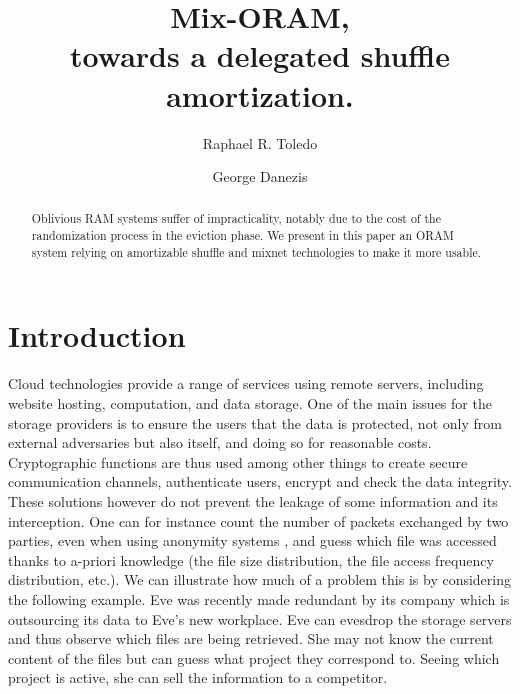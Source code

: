 \documentclass[conference]{IEEEtran}
\newcommand{\raphael}[1]{\textcolor{blue}{Raphael: #1}}
\begin{document}
\author{Raphael R. Toledo}
\author{George Danezis}


\title{Mix-ORAM,\\ towards a delegated shuffle amortization.}

\maketitle

\begin{abstract}
{Oblivious RAM systems suffer of impracticality, notably due to the cost of the randomization process in the eviction phase.
We present in this paper an ORAM system relying on amortizable shuffle and mixnet technologies to make it more usable.}
\end{abstract}

\section{Introduction}
\iffalse
\begin{itemize}
 \item Introduction to ORAM (we have to hide the access pattern) ~/
 \item Different ORAM over time \raphael{p.2 TODO}
 \item Eviction is too costly to happen at once /
 \item Emergence of A.S. \raphael{TODO}
 \item Combining ORAM and AS \raphael{p.3 TODO}
\end{itemize}
\fi

Cloud technologies provide a range of services using remote servers, including website hosting, computation, and data storage. One of the main issues for the storage providers is to ensure the users that the data is protected, not only from external adversaries but also itself, and doing so for reasonable costs. 
Cryptographic functions are thus used among other things to create secure communication channels, authenticate users, encrypt and check the data integrity.
These solutions however do not prevent the leakage of some information and its interception. One can for instance count the number of packets exchanged by two parties, even when using anonymity systems \cite{murdoch2005}, and guess which file was accessed thanks to a-priori knowledge (the file size distribution, the file access frequency distribution, etc.).
We can illustrate how much of a problem this is by considering the following example. Eve was recently made redundant by its company which is outsourcing its data to Eve's new workplace. Eve can evesdrop the storage servers and thus observe which files are being retrieved. She may not know the current content of the files but can guess what project they correspond to. Seeing which project is active, she can sell the information to a competitor.  
\end{document}
